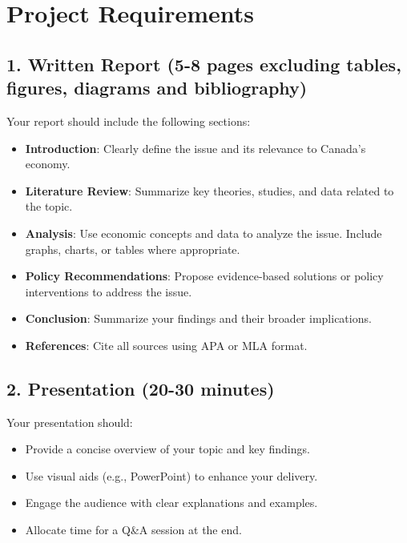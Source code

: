 \documentclass[12pt]{article}
\begin{document}
\section*{Project Requirements}
\subsection*{1. Written Report (5-8 pages excluding tables, figures, diagrams and bibliography)}
Your report should include the following sections:
\begin{itemize}
    \item \textbf{Introduction}: Clearly define the issue and its relevance to Canada’s economy.
    \item \textbf{Literature Review}: Summarize key theories, studies, and data related to the topic.
    \item \textbf{Analysis}: Use economic concepts and data to analyze the issue. Include graphs, charts, or tables where appropriate.
    \item \textbf{Policy Recommendations}: Propose evidence-based solutions or policy interventions to address the issue.
    \item \textbf{Conclusion}: Summarize your findings and their broader implications.
    \item \textbf{References}: Cite all sources using APA or MLA format.
\end{itemize}

\subsection*{2. Presentation (20-30 minutes)}
Your presentation should:
\begin{itemize}
    \item Provide a concise overview of your topic and key findings.
    \item Use visual aids (e.g., PowerPoint) to enhance your delivery.
    \item Engage the audience with clear explanations and examples.
    \item Allocate time for a Q\&A session at the end.
\end{itemize}
\newpage
\end{document}
